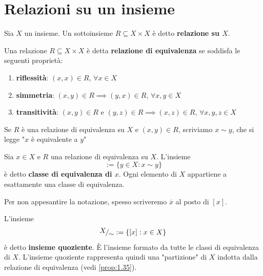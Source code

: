 \documentclass[../main.tex]{subfiles}
\begin{document}
\section{Relazioni su un insieme}

\begin{definition}[Relazione]
    Sia $X$ un insieme. Un sottoinsieme $R \subseteq X \times X$ è detto \textbf{relazione su $X$}.
\end{definition}

\begin{definition}
    Una relazione $R \subseteq X \times X$ è detta \textbf{relazione di equivalenza} se soddisfa le seguenti proprietà:
    \begin{enumerate}[label=(\roman*)]
        \item \textbf{riflessità}: $(x,x) \in R$, $\forall x \in X$
        \item \textbf{simmetria}: $(x,y) \in R \implies (y,x) \in R$, $\forall x,y \in X$
        \item \textbf{transitività}: $(x,y) \in R \text{ e } (y,z) \in R \implies (x,z) \in R$, $\forall x,y,z \in X$
    \end{enumerate}
\end{definition}

Se $R$ è una relazione di equivalenza su $X$ e $(x,y) \in R$, scriviamo $x \sim y$, che si legge "$x$ è equivalente a $y$"

\begin{definition}
    Sia $x \in X$ e $R$ una relazione di equivalenza su $X$. L'insieme
    \begin{equation*}
        [x] := \{y \in X : x \sim y\}
    \end{equation*}
    è detto \textbf{classe di equivalenza di $x$}. Ogni elemento di $X$ appartiene a esattamente una classe di equivalenza.
\end{definition}

Per non appesantire la notazione, spesso scriveremo $\overline{x}$ al posto di $[x]$.

\begin{definition}
    L'insieme
    \[
        \nicefrac{X}{\sim} := \{[x] : x \in X\}
    \]
    è detto \textbf{insieme quoziente}. È l'insieme formato da tutte le classi di equivalenza di $X$. L'insieme quoziente rappresenta quindi una "partizione" di $X$ indotta dalla relazione di equivalenza (vedi \ref{prop:1.35}).
\end{definition}
\end{document}
